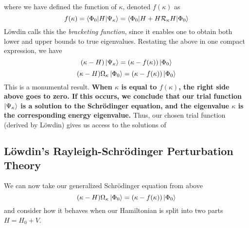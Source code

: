 \documentclass{article}
\begin{document}
where we have defined the function of $\kappa$, denoted  $f(\kappa)$ as
\[ f(\kappa) =  \braket{\Phi_0 | H | \Psi_\kappa} = \braket{\Phi_0 | H + H \mathcal{R}_\kappa H  | \Phi_0}\]
L{\"o}wdin calls this the \textit{bracketing function}, since it enables one to obtain both lower and upper bounds to true eigenvalues.
Restating the above in one compact expression, we have 
\[ (\kappa - H) \ket{\Psi_{\kappa}} = (\kappa - f(\kappa)) \ket{\Phi_0} \]
\[ (\kappa - H) \Omega_\kappa \ket{\Phi_0} = (\kappa - f(\kappa)) \ket{\Phi_0} \]
This is a monumental result.
\textbf{When $\kappa$ is equal to $f(\kappa)$, the right side above goes to zero. If this occurs,
we conclude that our trial function $\ket{\Psi_{\kappa}}$
is a solution to the Schr{\"o}dinger equation, and the eigenvalue $\kappa$ is the corresponding 
energy eigenvalue.}  
Thus, our chosen trial function (derived by L{\"o}wdin) gives us access to the solutions of 
%

%

\subsection{L{\"o}wdin's Rayleigh-Schr{\"o}dinger Perturbation Theory}
We can now take our generalized Schr{\"o}dinger equation from above 
\[ (\kappa - H) \Omega_\kappa \ket{\Phi_0} = (\kappa - f(\kappa)) \ket{\Phi_0} \]
and consider how it behaves when our Hamiltonian is split into two parts $H = H_0 + V$. 
\end{document}

